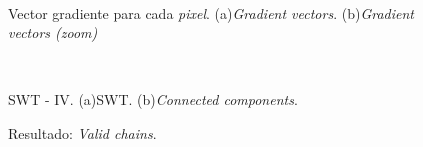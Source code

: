 \begin{figure}
	\\
  \caption[SWT - III]{Vector gradiente para cada \textit{pixel}. 
  (a)\textit{Gradient vectors}. (b)\textit{Gradient vectors (zoom)}}
  \label{Fig:cap-swt:paso03}
\end{figure}

\begin{figure}
	\setlength{\fboxsep}{0pt}
	\\
  \caption[SWT - IV]{SWT - IV. (a)SWT. (b)\textit{Connected components}.}
  \label{Fig:cap-swt:paso04}  
\end{figure}

\begin{figure}[h!]
	\setlength{\fboxsep}{0pt}
  \caption[SWT - V]{Resultado: \textit{Valid chains}.}
  \label{Fig:cap-swt:paso05}	
\end{figure}
